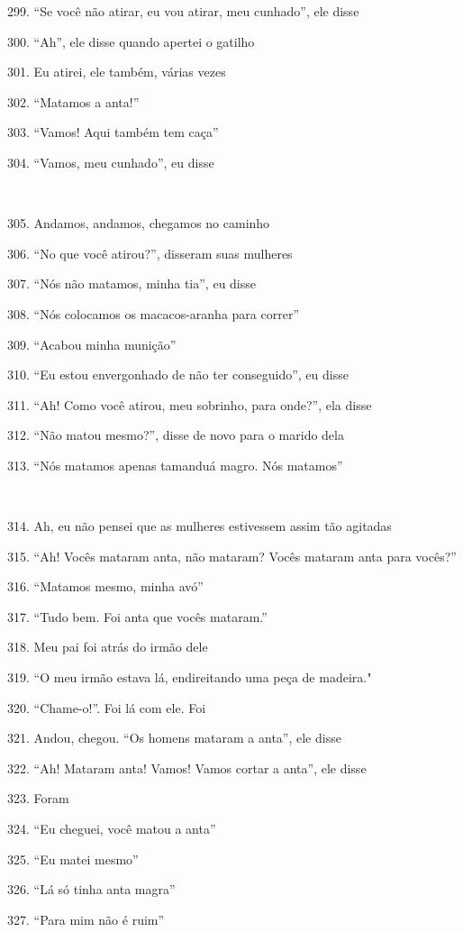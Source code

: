 299. ``Se você não atirar, eu vou atirar, meu cunhado'', ele disse

300. ``Ah'', ele disse quando apertei o gatilho

301. Eu atirei, ele também, várias vezes

302. ``Matamos a anta!''

303. ``Vamos! Aqui também tem caça''

304. ``Vamos, meu cunhado'', eu disse

~

305. Andamos, andamos, chegamos no caminho

306. ``No que você atirou?'', disseram suas mulheres

307. ``Nós não matamos, minha tia'', eu disse

308. ``Nós colocamos os macacos-aranha para correr''

309. ``Acabou minha munição''

310. ``Eu estou envergonhado de não ter conseguido'', eu disse

311. ``Ah! Como você atirou, meu sobrinho, para onde?'', ela disse

312. ``Não matou mesmo?'', disse de novo para o marido dela

313. ``Nós matamos apenas tamanduá magro. Nós matamos''

~

314. Ah, eu não pensei que as mulheres estivessem assim tão agitadas

315. ``Ah! Vocês mataram anta, não mataram? Vocês mataram anta para vocês?''

316. ``Matamos mesmo, minha avó''

317. ``Tudo bem. Foi anta que vocês mataram.''

318. Meu pai foi atrás do irmão dele

319. ``O meu irmão estava lá, endireitando uma peça de madeira."

320. ``Chame-o!''. Foi lá com ele. Foi

321. Andou, chegou. ``Os homens mataram a anta'', ele disse

322. ``Ah! Mataram anta! Vamos! Vamos cortar a anta'', ele disse

323. Foram

324. ``Eu cheguei, você matou a anta''

325. ``Eu matei mesmo''

326. ``Lá só tinha anta magra''

327. ``Para mim não é ruim''

